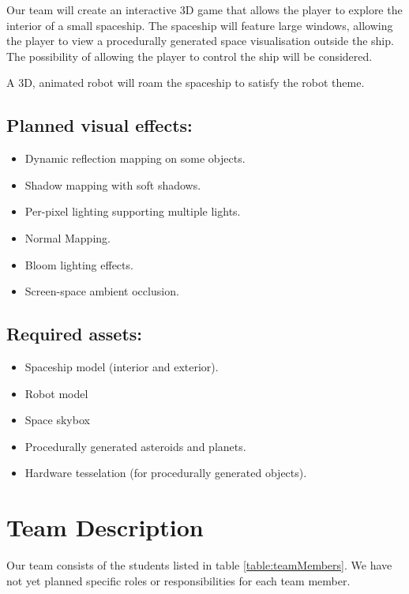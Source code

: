 \documentclass[11pt]{scrartcl} %
\begin{document}
    Our team will create an interactive 3D game that allows the player to
    explore the interior of a small spaceship.
    The spaceship will feature large
    windows, allowing the player to view a procedurally generated space
    visualisation outside the ship.
    The possibility of allowing the player to control the ship will be
    considered.

    A 3D, animated robot will roam the spaceship to satisfy the robot theme.

    \subsection*{Planned visual effects:}
    \begin{itemize}
        \item Dynamic reflection mapping on some objects.
        \item Shadow mapping with soft shadows.
        \item Per-pixel lighting supporting multiple lights.
        \item Normal Mapping.
        \item Bloom lighting effects.
        \item Screen-space ambient occlusion.
    \end{itemize}

    \subsection*{Required assets:}
    \begin{itemize}
        \item Spaceship model (interior and exterior).
        \item Robot model
        \item Space skybox
        \item Procedurally generated asteroids and planets.
        \item Hardware tesselation (for procedurally generated objects).
    \end{itemize}

\section*{Team Description}
    Our team consists of the students listed in table \ref{table:teamMembers}.
    We have not yet planned specific roles or responsibilities for each team
    member.
\end{document}

